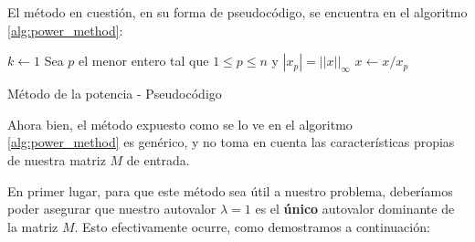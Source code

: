 \par El m\'etodo en cuesti\'on, en su forma de pseudoc\'odigo, se encuentra en
el algoritmo \ref{alg:power_method}:
\begin{algorithm}
    $k\gets 1$\;
    Sea $p$ el menor entero tal que $1\leq p\leq n$ y $\displaystyle |x_p| =
        ||x||_\infty$\;
    $x\gets x/x_p$\;
    \;
    \caption{M\'etodo de la potencia - Pseudoc\'odigo~\cite[p.578]{Burden2010}}
    \label{alg:power_method}
\end{algorithm}

\par Ahora bien, el m\'etodo expuesto como se lo ve en el algoritmo
\ref{alg:power_method} es gen\'erico, y no toma en cuenta las caracter\'isticas
propias de nuestra matriz $M$ de entrada.

\par En primer lugar, para que este m\'etodo sea \'util a nuestro problema,
deber\'iamos poder asegurar que nuestro autovalor $\lambda = 1$ es el
\textbf{\'unico} autovalor dominante de la matriz $M$. Esto efectivamente
ocurre, como demostramos a continuaci\'on:


